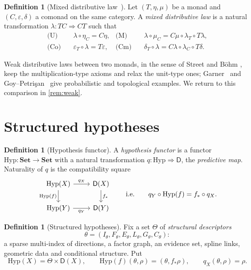\documentclass[11pt]{article}
\theoremstyle{definition}
\newtheorem{definition}[theorem]{Definition}
\theoremstyle{remark}
\newcommand{\D}{\mathsf{D}}
\newcommand{\Set}{\mathbf{Set}}
\newcommand{\Hyp}{\mathrm{Hyp}}
\begin{document}
\begin{definition}[Mixed distributive law~\cite{Beck1969,PowerWatanabe2002}]\label{def:mixed}
Let $(T,\eta,\mu)$ be a monad and $(C,\varepsilon,\delta)$ a comonad on the same category. A
\emph{mixed distributive law} is a natural transformation $\lambda\colon TC\Rightarrow CT$ such that
\begin{align*}
\text{(U)}\quad & \lambda\circ\eta_{C} = C\eta, &
\text{(M)}\quad & \lambda\circ\mu_{C} = C\mu\circ\lambda_{T}\circ T\lambda,\\
\text{(Co)}\quad & \varepsilon_{T}\circ\lambda = T\varepsilon, &
\text{(Cm)}\quad & \delta_{T}\circ\lambda = C\lambda\circ\lambda_{C}\circ T\delta.
\end{align*}
\end{definition}

Weak distributive laws between two monads, in the sense of Street and B\"ohm
\cite{Street2009,Bohm2010,BohmLackStreet2011}, keep the multiplication-type axioms and relax the
unit-type ones; Garner~\cite{Garner2020} and Goy--Petri\c{s}an~\cite{GoyPetrisan2020} give
probabilistic and topological examples. We return to this comparison in \cref{rem:weak}.

\section{Structured hypotheses}\label{sec:hyp}

\begin{definition}[Hypothesis functor]\label{def:hypfunctor}
A \emph{hypothesis functor} is a functor $\Hyp\colon\Set\to\Set$ with a natural transformation
$q\colon\Hyp\Rightarrow\D$, the \emph{predictive map}. Naturality of $q$ is the compatibility square
\[
\begin{tikzcd}
\Hyp(X) \arrow[r,"q_X"] \arrow[d,"\Hyp(f)"'] & \D(X) \arrow[d,"f_*"]\\
\Hyp(Y) \arrow[r,"q_Y"'] & \D(Y)
\end{tikzcd}
\qquad\text{i.e.}\qquad q_Y\circ\Hyp(f)=f_*\circ q_X .
\]
\end{definition}

\begin{definition}[Structured hypotheses]\label{def:structured}
Fix a set $\Theta$ of \emph{structural descriptors}
\[\theta=(I_\theta,F_\theta,E_\theta,L_\theta,G_\theta,C_\theta):\]
a sparse multi-index of
directions, a factor graph, an evidence set, spline links, geometric data and conditional structure.
Put
\[
\Hyp(X)=\Theta\times\D(X),\qquad \Hyp(f)(\theta,\rho)=(\theta,f_*\rho),\qquad q_X(\theta,\rho)=\rho .
\]
\end{definition}
\end{document}
